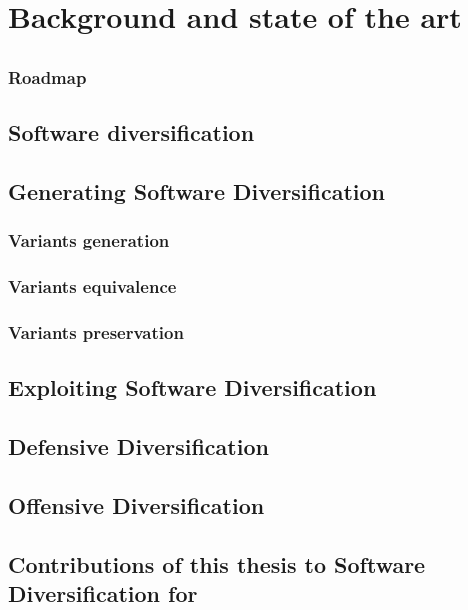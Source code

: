 \chapter{Background and state of the art}
\label{SOTA}


\section{\Wasm}

\subsection{Roadmap}

\section{Software diversification}

\section{Generating Software Diversification}

\subsection{Variants generation}

\subsection{Variants equivalence}

\subsection{Variants preservation}


\section{Exploiting Software Diversification}

\section{Defensive Diversification}

\section{Offensive Diversification}

\section{Contributions of this thesis to Software Diversification for \Wasm}